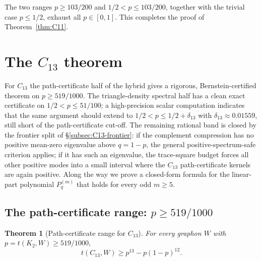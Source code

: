 \documentclass[11pt]{article}
\newtheorem{theorem}{Theorem}[section]
\begin{document}
\medskip

The two ranges $p\ge103/200$ and $1/2<p\le103/200$, together with the trivial case $p\le1/2$, exhaust all $p\in[0,1]$.  This completes the proof of Theorem~\ref{thm:C11}.

\section{The $C_{13}$ theorem}\label{sec:C13}

For $C_{13}$ the path-certificate half of the hybrid gives a rigorous, Bernstein-certified theorem on $p\ge519/1000$.  The triangle-density spectral half has a clean exact certificate on $1/2<p\le51/100$; a high-precision scalar computation indicates that the same argument should extend to $1/2<p\le1/2+\delta_{13}$ with $\delta_{13}\approx0.01559$, still short of the path-certificate cut-off.  The remaining rational band is closed by the frontier split of \S\ref{subsec:C13-frontier}: if the complement compression has no positive mean-zero eigenvalue above $q=1-p$, the general positive-spectrum-safe criterion applies; if it has such an eigenvalue, the trace-square budget forces all other positive modes into a small interval where the $C_{13}$ path-certificate kernels are again positive.  Along the way we prove a closed-form formula for the linear-part polynomial $P_q^{(m)}$ that holds for every odd $m\ge5$.

\subsection{The path-certificate range: $p\ge519/1000$}\label{subsec:C13-path}

\begin{theorem}[Path-certificate range for $C_{13}$]\label{thm:C13-path}
For every graphon $W$ with $p=t(K_2,W)\ge519/1000$,
\[
        t(C_{13},W)\ge p^{13}-p(1-p)^{12}.
\]
\end{theorem}
\end{document}
